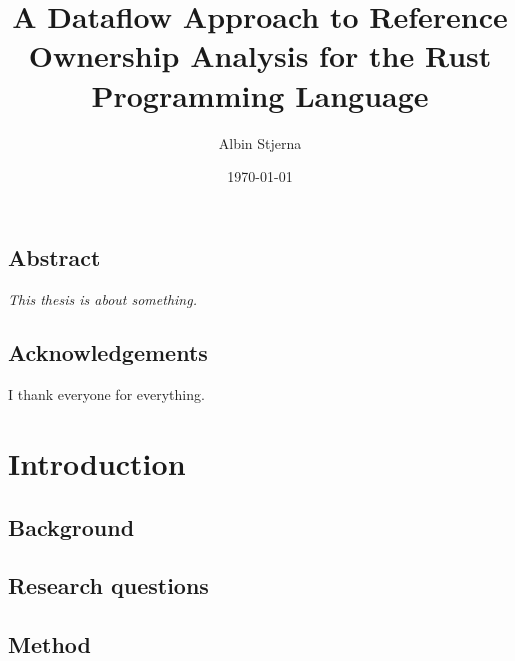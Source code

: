 \documentclass[11pt,a4paper,twoside,openany]{book}
\author{Albin Stjerna}
\date{\today}
\title{A Dataflow Approach to Reference Ownership Analysis for the Rust Programming Language}
\newcommand{\fixme}[1] {{\color{red}#1}}
\begin{document}
\frontmatter


\maketitle

    \chapter*{Abstract}
    \textit{\fixme{This thesis is about something.}}


    \begingroup
    \tableofcontents
    \listoffigures
    \listoftables
    \endgroup


    \chapter{Acknowledgements}
    \fixme{I thank everyone for everything.}

    \part{Introduction}
    \mainmatter{}
    \chapter{Background}
    \chapter{Research questions}
    \chapter{Method}
\end{document}

